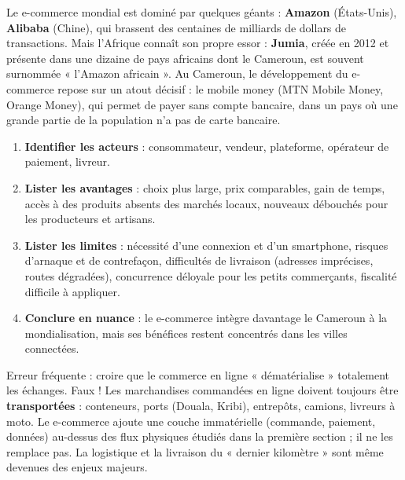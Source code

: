 \documentclass[11pt]{article}
\newcommand{\cle}[1]{{\popxbold\color{popdark}#1}}
\begin{document}
Le e-commerce mondial est dominé par quelques géants : \textbf{Amazon} (États-Unis), \textbf{Alibaba} (Chine), qui brassent des centaines de milliards de dollars de transactions. Mais l'Afrique connaît son propre essor : \textbf{Jumia}, créée en 2012 et présente dans une dizaine de pays africains dont le Cameroun, est souvent surnommée « l'Amazon africain ». Au Cameroun, le développement du e-commerce repose sur un atout décisif : le \cle{mobile money} (MTN Mobile Money, Orange Money), qui permet de payer sans compte bancaire, dans un pays où une grande partie de la population n'a pas de carte bancaire.

\begin{methode}
\begin{enumerate}
\item \textbf{Identifier les acteurs} : consommateur, vendeur, plateforme, opérateur de paiement, livreur.
\item \textbf{Lister les avantages} : choix plus large, prix comparables, gain de temps, accès à des produits absents des marchés locaux, nouveaux débouchés pour les producteurs et artisans.
\item \textbf{Lister les limites} : nécessité d'une connexion et d'un smartphone, risques d'arnaque et de contrefaçon, difficultés de livraison (adresses imprécises, routes dégradées), concurrence déloyale pour les petits commerçants, fiscalité difficile à appliquer.
\item \textbf{Conclure en nuance} : le e-commerce intègre davantage le Cameroun à la mondialisation, mais ses bénéfices restent concentrés dans les villes connectées.
\end{enumerate}
\end{methode}

\begin{attention}
Erreur fréquente : croire que le commerce en ligne « dématérialise » totalement les échanges. Faux ! Les marchandises commandées en ligne doivent toujours être \textbf{transportées} : conteneurs, ports (Douala, Kribi), entrepôts, camions, livreurs à moto. Le e-commerce ajoute une couche immatérielle (commande, paiement, données) au-dessus des flux physiques étudiés dans la première section ; il ne les remplace pas. La logistique et la livraison du « dernier kilomètre » sont même devenues des enjeux majeurs.
\end{attention}
\end{document}
